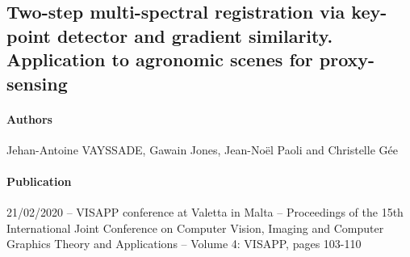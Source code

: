 \documentclass[../thesis.tex]{subfiles}
\begin{document}
	\newpage
    \null
    \vfill
	\subsection*{Two-step multi-spectral registration via key-point detector and gradient similarity. Application to agronomic scenes for proxy-sensing}
	
	\paragraph{Authors} Jehan-Antoine VAYSSADE, Gawain Jones, Jean-Noël Paoli and Christelle Gée
	
    
    \paragraph{Publication} 21/02/2020 -- VISAPP conference at Valetta in Malta -- Proceedings of the 15th International Joint Conference on Computer Vision, Imaging and Computer Graphics Theory and Applications -- Volume 4: VISAPP, pages 103-110 %
	
\end{document}
